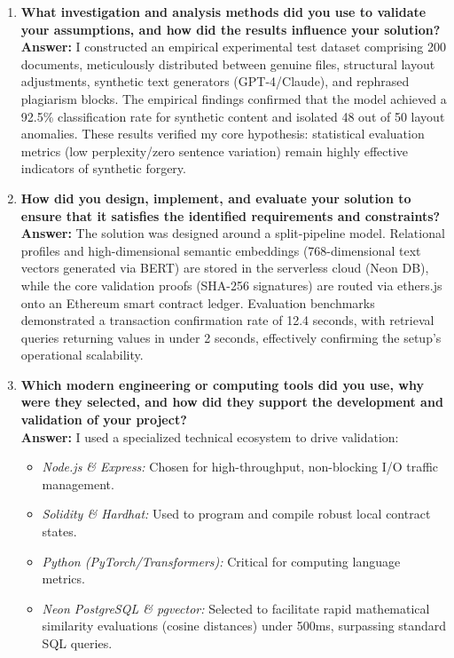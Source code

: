 \begin{enumerate}[label=\roman*.]
    \item \textbf{What investigation and analysis methods did you use to validate your assumptions, and how did the results influence your solution?} \\
    \textbf{Answer:} I constructed an empirical experimental test dataset comprising 200 documents, meticulously distributed between genuine files, structural layout adjustments, synthetic text generators (GPT-4/Claude), and rephrased plagiarism blocks. The empirical findings confirmed that the model achieved a 92.5\% classification rate for synthetic content and isolated 48 out of 50 layout anomalies. These results verified my core hypothesis: statistical evaluation metrics (low perplexity/zero sentence variation) remain highly effective indicators of synthetic forgery.

    \item \textbf{How did you design, implement, and evaluate your solution to ensure that it satisfies the identified requirements and constraints?} \\
    \textbf{Answer:} The solution was designed around a split-pipeline model. Relational profiles and high-dimensional semantic embeddings (768-dimensional text vectors generated via BERT) are stored in the serverless cloud (Neon DB), while the core validation proofs (SHA-256 signatures) are routed via ethers.js onto an Ethereum smart contract ledger. Evaluation benchmarks demonstrated a transaction confirmation rate of 12.4 seconds, with retrieval queries returning values in under 2 seconds, effectively confirming the setup's operational scalability.

    \item \textbf{Which modern engineering or computing tools did you use, why were they selected, and how did they support the development and validation of your project?} \\
    \textbf{Answer:} I used a specialized technical ecosystem to drive validation:
    \begin{itemize}
        \item \textit{Node.js \& Express:} Chosen for high-throughput, non-blocking I/O traffic management.
        \item \textit{Solidity \& Hardhat:} Used to program and compile robust local contract states.
        \item \textit{Python (PyTorch/Transformers):} Critical for computing language metrics.
        \item \textit{Neon PostgreSQL \& pgvector:} Selected to facilitate rapid mathematical similarity evaluations (cosine distances) under 500ms, surpassing standard SQL queries.
    \end{itemize}


\end{enumerate}
